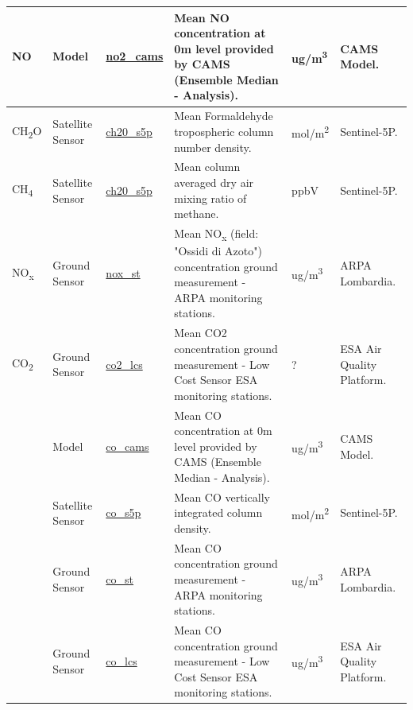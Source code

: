 \begin{center}
\begin{longtable}{ |p{2cm}|p{1.5cm}|p{2.3cm}|p{4cm}|p{1cm}|p{2cm}| }
\multirow{1}{4em}{NO} & Model  & \underline{no2\_cams} & Mean NO concentration at 0m level provided by CAMS  (Ensemble Median - Analysis). \par& ug/m\textsuperscript{3} & CAMS Model.\\  \hline

\multirow{1}{4em}{CH\textsubscript{2}O} & Satellite \newline Sensor  & \underline{ch20\_s5p} & Mean Formaldehyde tropospheric column number density. \par& mol/m\textsuperscript{2} & Sentinel-5P.\\  \hline

\multirow{1}{4em}{CH\textsubscript{4}} & Satellite \newline Sensor  & \underline{ch20\_s5p} & Mean column averaged dry air mixing ratio of methane. \par& ppbV & Sentinel-5P.\\  \hline

\multirow{1}{4em}{NO\textsubscript{x}} & Ground \newline Sensor & \underline{nox\_st} &  Mean NO\textsubscript{x} (field: "Ossidi di Azoto") concentration ground measurement - ARPA monitoring stations.\par  & ug/m\textsuperscript{3} & ARPA \newline Lombardia.\\ \hline

\multirow{1}{4em}{CO\textsubscript{2}} & Ground \newline Sensor & \underline{co2\_lcs} &  Mean CO2 concentration ground measurement - Low Cost Sensor ESA monitoring stations. \par & ? & ESA Air Quality Platform.\\ \hline
\pagebreak
\hline
\multirow{4}{4em}{CO} & Model  & \underline{co\_cams} & Mean CO concentration at 0m level provided by CAMS  (Ensemble Median - Analysis).\par & ug/m\textsuperscript{3} & CAMS Model.\\ 
& Satellite \newline Sensor  & \underline{co\_s5p} &  Mean CO vertically integrated column density.\par & mol/m\textsuperscript{2} & Sentinel-5P.\\ 
& Ground \newline Sensor & \underline{co\_st} &  Mean CO concentration ground measurement - ARPA monitoring stations. \par & ug/m\textsuperscript{3} & ARPA \newline Lombardia.\\ 
& Ground \newline Sensor & \underline{co\_lcs} &  Mean CO concentration ground measurement - Low Cost Sensor ESA monitoring stations. \par & ug/m\textsuperscript{3} & ESA Air Quality Platform.\\ \hline


\end{longtable}
\end{center}

